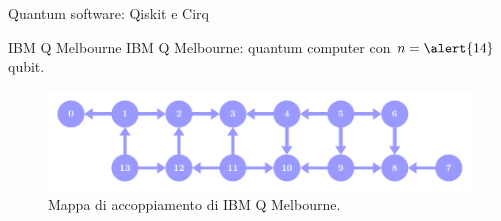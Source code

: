 \documentclass{beamer}
\renewcommand{\'}[0]{\`}
\begin{document}
\begin{frame}{Quantum software: Qiskit e Cirq}
%	
%	
%	
%	
%	




	
 	\end{frame}

\setbeamercovered{} 


	\begin{frame}{IBM Q Melbourne}
	\alert{IBM Q Melbourne}: quantum computer con $n=\alert{14}$ qubit. \pause
	\vspace{0.5cm}
	
	\begin{figure} \includegraphics[width=1\textwidth]{./tikz/IBMQMelbourne.pdf} \caption{Mappa di accoppiamento di IBM Q Melbourne. } \end{figure}
	 \vspace{0.5cm}
	 
	\end{frame}
	
\end{document}
